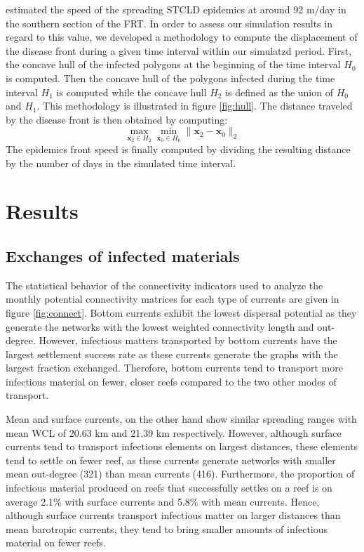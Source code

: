 \documentclass[utf8]{frontiersSCNS}
\begin{document}
\cite{muller2020spatial} estimated the speed of the spreading STCLD epidemics at around 92 m/day in the southern section of the FRT. In order to assess our simulation results in regard to this value, we developed a methodology to compute the displacement of the disease front during a given time interval within our simulatzd period. First, the concave hull of the infected polygons at the beginning of the time interval $H_0$ is computed. Then the concave hull of the polygons infected during the time interval $H_1$ is computed while the concave hull $H_2$ is defined as the union of $H_0$ and $H_1$. This methodology is illustrated in figure \ref{fig:hull}. The distance traveled by the disease front is then obtained by computing:
\begin{equation}
    \max\limits_{\mathbf{x}_2\in H_2}\min\limits_{\mathbf{x}_0\in H_0} \|\mathbf{x}_2 - \mathbf{x}_0\|_2
\end{equation}
The epidemics front speed is finally computed by dividing the resulting distance by the number of days in the simulated time interval.

\section{Results}

\subsection{Exchanges of infected materials}

The statistical behavior of the connectivity indicators used to analyze the monthly potential connectivity matrices for each type of currents are given in figure \ref{fig:connect}. Bottom currents exhibit the lowest dispersal potential as they generate the networks with the lowest weighted connectivity length and out-degree. However, infectious matters transported by bottom currents have the largest settlement success rate as these currents generate the graphs with the largest fraction exchanged. Therefore, bottom currents tend to transport more infectious material on fewer, closer reefs compared to the two other modes of transport.

Mean and surface currents, on the other hand show similar spreading ranges with mean WCL of 20.63 km and 21.39 km respectively. However, although surface currents tend to transport infectious elements on largest distances, these elements tend to settle on fewer reef, as these currents generate networks with smaller mean out-degree (321) than mean currents (416). Furthermore, the proportion of infectious material produced on reefs that successfully settles on a reef is on average 2.1\% with surface currents and 5.8\% with mean currents. Hence, although surface currents transport infectious matter on larger distances than mean barotropic currents, they tend to bring smaller amounts of infectious material on fewer reefs.
\end{document}
